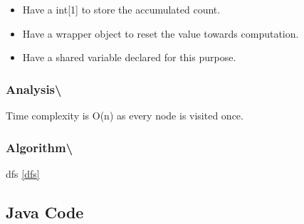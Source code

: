 \documentclass[]{book}
\providecommand{\tightlist}{%
  \setlength{\itemsep}{0pt}\setlength{\parskip}{0pt}}
\begin{document}
\begin{itemize}
\tightlist
\item
  Have a int{[}1{]} to store the accumulated count.
\item
  Have a wrapper object to reset the value towards computation.
\item
  Have a shared variable declared for this purpose.
\end{itemize}

\hypertarget{analysis-84}{%
\subsubsection{Analysis\textbackslash{}}\label{analysis-84}}

Time complexity is O(n) as every node is visited once.

\hypertarget{algorithm-85}{%
\subsubsection{Algorithm\textbackslash{}}\label{algorithm-85}}

dfs \ref{dfs}

\hypertarget{java-code-49}{%
\subsection{Java Code}\label{java-code-49}}
\end{document}
